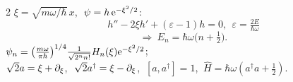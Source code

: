 \documentclass[11pt,a4paper,twoside]{article}
\begin{document}
{\begin{multicols}{2}
 $\xi=\sqrt{m\omega/\hbar}\,x$, $\ \psi=h\,\mathrm{e}^{-\xi^2/2}$:
\[h''-2\xi h'+(\varepsilon-1)h=0,\ \ \varepsilon=\tfrac{2E}{\hbar\omega}\]\[\Rightarrow\ E_n=\hbar\omega\bigl(n+\tfrac12\bigr).\]
$\psi_n=\bigl(\frac{m\omega}{\pi\hbar}\bigr)^{1/4}\frac{1}{\sqrt{2^nn!}}H_n(\xi)\mathrm{e}^{-\xi^2/2}$;\\
$\sqrt2a=\xi+\partial_\xi$, $\ \sqrt2a^\dagger=\xi-\partial_\xi$, $\ [a,a^\dagger]=1$, $\ \hat H=\hbar\omega(a^\dagger a+\frac12)$.
\end{multicols}
}
\end{document}
